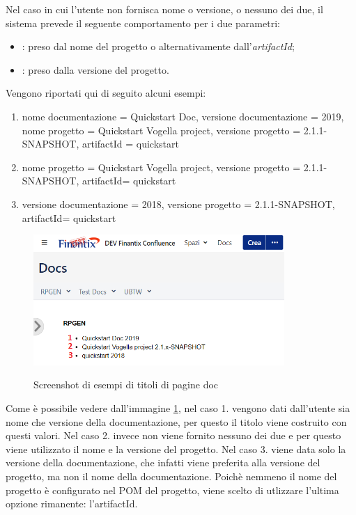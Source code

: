 
	Nel caso in cui l'utente non fornisca nome o versione, o nessuno dei due, il sistema prevede il seguente comportamento per i due parametri:
	\begin{itemize}
		\item {}: preso dal nome del progetto o alternativamente dall'\emph{artifactId};
		\item {}: preso dalla versione del progetto.
	\end{itemize} 

	Vengono riportati qui di seguito alcuni esempi:
	\begin{enumerate}
		\item nome documentazione = Quickstart Doc, versione documentazione = 2019, nome progetto = Quickstart Vogella project, versione progetto = 2.1.1-SNAPSHOT, artifactId = quickstart
		\item nome progetto = Quickstart Vogella project, versione progetto = 2.1.1-SNAPSHOT,  artifactId= quickstart
		\item versione documentazione = 2018, versione progetto = 2.1.1-SNAPSHOT,  artifactId= quickstart
	\end{enumerate}

	\begin{figure}[H]
		\centering
		\includegraphics[width=0.85\textwidth]{immagini/DocsExamples.png}\\
		\caption{Screenshot di esempi di titoli di pagine doc}
		\label{screenDocsNameVersion}
	\end{figure}

	Come è possibile vedere dall'immagine \ref{screenDocsNameVersion}, nel caso 1. vengono dati dall'utente sia nome che versione della documentazione, per questo il titolo viene costruito con questi valori.
	Nel caso 2. invece non viene fornito nessuno dei due e per questo viene utilizzato il nome e la versione del progetto. 
	Nel caso 3. viene data solo la versione della documentazione, che infatti viene preferita alla versione del progetto, ma non il nome della documentazione. 
	Poichè nemmeno il nome del progetto è configurato nel POM del progetto, viene scelto di utlizzare l'ultima opzione rimanente: l'artifactId.

